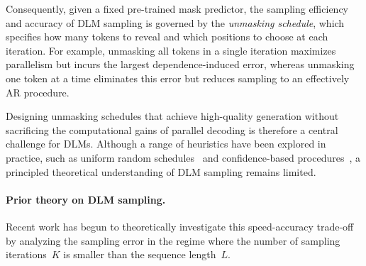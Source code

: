\documentclass[english]{article}
\begin{document}
Consequently, given a fixed pre-trained mask predictor, the sampling efficiency and accuracy of DLM sampling is governed by the \textit{unmasking schedule}, which specifies how many tokens to reveal and which positions to choose at each iteration. 
For example, unmasking all tokens in a single iteration maximizes parallelism but incurs the largest dependence-induced error, whereas unmasking one token at a time eliminates this error but reduces sampling to an effectively AR procedure.

%

Designing unmasking schedules that achieve high-quality generation without sacrificing the computational gains of parallel decoding is therefore a central challenge for DLMs.
Although a range of heuristics have been explored in practice, such as uniform random schedules~\citep{shi2024simplified,sahoo2024simple,nie2025large} and confidence-based procedures~\citep{ben2025accelerated}, a principled theoretical understanding of DLM sampling remains limited.

\paragraph{Prior theory on DLM sampling.}
Recent work has begun to theoretically investigate this speed-accuracy trade-off by analyzing the sampling error in the regime where the number of sampling iterations~$K$ is smaller than the sequence length~$L$.

\end{document}
